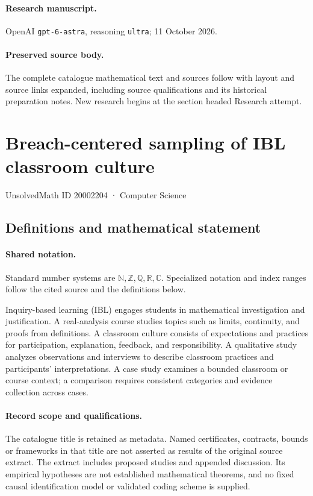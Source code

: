 \documentclass[11pt]{article}
\begin{document}
\paragraph{Research manuscript.} OpenAI \texttt{gpt-6-astra}, reasoning \texttt{ultra}; 11 October 2026.
\paragraph{Preserved source body.} The complete catalogue mathematical text and sources follow with layout and source links expanded, including source qualifications and its historical preparation notes. New research begins at the section headed Research attempt.

\section{Breach-centered sampling of IBL classroom culture}\label{20002204}
{\small UnsolvedMath ID 20002204 · Computer Science}
\subsection{Definitions and mathematical statement}

\paragraph{Shared notation.}Standard number systems are $\mathbb N,\mathbb Z,\mathbb Q,\mathbb R,\mathbb C$. Specialized notation and index ranges follow the cited source and the definitions below.


Inquiry-based learning (IBL) engages students in mathematical investigation and justification. A real-analysis course studies topics such as limits, continuity, and proofs from definitions. A classroom culture consists of expectations and practices for participation, explanation, feedback, and responsibility. A qualitative study analyzes observations and interviews to describe classroom practices and participants' interpretations. A case study examines a bounded classroom or course context; a comparison requires consistent categories and evidence collection across cases.
\paragraph{Record scope and qualifications.}
The catalogue title is retained as metadata. Named certificates, contracts, bounds or frameworks in that title are not asserted as results of the original source extract.
The extract includes proposed studies and appended discussion. Its empirical hypotheses are not established mathematical theorems, and no fixed causal identification model or validated coding scheme is supplied.
\end{document}
